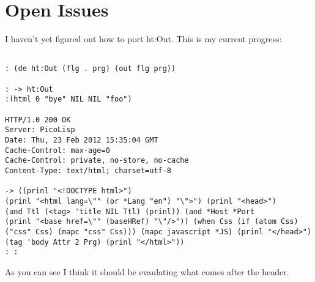 \documentclass[10pt,a4paper]{article}
\begin{document}
\section*{Open Issues}
I haven't yet figured out how to port ht:Out. This is my current progress:

\begin{verbatim}

: (de ht:Out (flg . prg) (out flg prg))

: -> ht:Out
:(html 0 "bye" NIL NIL "foo")

HTTP/1.0 200 OK
Server: PicoLisp
Date: Thu, 23 Feb 2012 15:35:04 GMT
Cache-Control: max-age=0
Cache-Control: private, no-store, no-cache
Content-Type: text/html; charset=utf-8

-> ((prinl "<!DOCTYPE html>")
(prinl "<html lang=\"" (or *Lang "en") "\">") (prinl "<head>")
(and Ttl (<tag> 'title NIL Ttl) (prinl)) (and *Host *Port
(prinl "<base href=\"" (baseHRef) "\"/>")) (when Css (if (atom Css)
("css" Css) (mapc "css" Css))) (mapc javascript *JS) (prinl "</head>")
(tag 'body Attr 2 Prg) (prinl "</html>"))
: :
\end{verbatim}


As you can see I think it should be evaulating what comes after the header.
\end{document}

